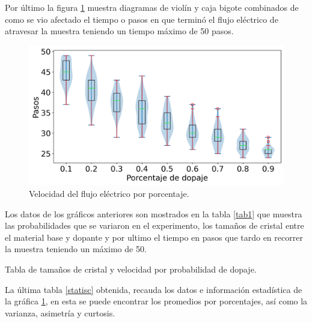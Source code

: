 \documentclass[9pt,twocolumn,twoside]{osajnl}
\begin{document}
Por último la figura \ref{im3} muestra diagramas de violín y caja bigote combinados de como se vio afectado el tiempo o pasos en que terminó el flujo eléctrico de atravesar la muestra teniendo un tiempo máximo de 50 pasos. 
\begin{figure}[h!]
    \centering
    \includegraphics[scale=.38]{tiempo_porc.png}
    \caption{Velocidad del flujo eléctrico por porcentaje.}
    \label{im3}
\end{figure}


Los datos de los gráficos anteriores son mostrados en la tabla \ref{tab1} que muestra las probabilidades que se variaron en el experimento, los tamaños de cristal entre el material base y dopante y por ultimo el tiempo en pasos que tardo en recorrer la muestra teniendo un máximo de 50.
\begin{table}[H]
    \centering
    \caption{Tabla de tamaños de cristal y velocidad por probabilidad de dopaje.}
    
    \label{tab1}
\end{table}

La última tabla \ref{statisc} obtenida, recauda los datos e información estadística de la gráfica \ref{im3}, en esta se puede encontrar los promedios por porcentajes, así como la varianza, asimetría y curtosis. 
\begin{table}[H]
    \centering
    \caption{Tabla estadística.}
    \label{statisc}
\end{table} 
\end{document}
